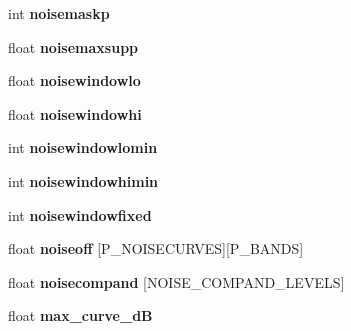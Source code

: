\begin{DoxyCompactItemize}
\item 
\hypertarget{structvorbis__info__psy_ac7d88922bbd445f3688f1b58a835afb3}{int {\bfseries noisemaskp}}\label{structvorbis__info__psy_ac7d88922bbd445f3688f1b58a835afb3}

\item 
\hypertarget{structvorbis__info__psy_ad102882d97e34592a277c60ac6636056}{float {\bfseries noisemaxsupp}}\label{structvorbis__info__psy_ad102882d97e34592a277c60ac6636056}

\item 
\hypertarget{structvorbis__info__psy_a6cfe41252db68bd2f1bb408119673b3a}{float {\bfseries noisewindowlo}}\label{structvorbis__info__psy_a6cfe41252db68bd2f1bb408119673b3a}

\item 
\hypertarget{structvorbis__info__psy_a8337b6979fcf921b4f975f3a88cf0394}{float {\bfseries noisewindowhi}}\label{structvorbis__info__psy_a8337b6979fcf921b4f975f3a88cf0394}

\item 
\hypertarget{structvorbis__info__psy_a2db09fd0e801f1b6f2c99850391fd940}{int {\bfseries noisewindowlomin}}\label{structvorbis__info__psy_a2db09fd0e801f1b6f2c99850391fd940}

\item 
\hypertarget{structvorbis__info__psy_ae3d1c2bece355a1dc347ea0f04e51a38}{int {\bfseries noisewindowhimin}}\label{structvorbis__info__psy_ae3d1c2bece355a1dc347ea0f04e51a38}

\item 
\hypertarget{structvorbis__info__psy_a6cb2aeec6204b044c4b4279c22e22d56}{int {\bfseries noisewindowfixed}}\label{structvorbis__info__psy_a6cb2aeec6204b044c4b4279c22e22d56}

\item 
\hypertarget{structvorbis__info__psy_aa9386a43b2fed4d8d322beeb86ca716c}{float {\bfseries noiseoff} \mbox{[}P\+\_\+\+N\+O\+I\+S\+E\+C\+U\+R\+V\+E\+S\mbox{]}\mbox{[}P\+\_\+\+B\+A\+N\+D\+S\mbox{]}}\label{structvorbis__info__psy_aa9386a43b2fed4d8d322beeb86ca716c}

\item 
\hypertarget{structvorbis__info__psy_a30e0f5a53a3803feabbe826578c8a5e7}{float {\bfseries noisecompand} \mbox{[}N\+O\+I\+S\+E\+\_\+\+C\+O\+M\+P\+A\+N\+D\+\_\+\+L\+E\+V\+E\+L\+S\mbox{]}}\label{structvorbis__info__psy_a30e0f5a53a3803feabbe826578c8a5e7}

\item 
\hypertarget{structvorbis__info__psy_a8aeb497662b106e241bd3232016aba66}{float {\bfseries max\+\_\+curve\+\_\+d\+B}}\label{structvorbis__info__psy_a8aeb497662b106e241bd3232016aba66}


\end{DoxyCompactItemize}
